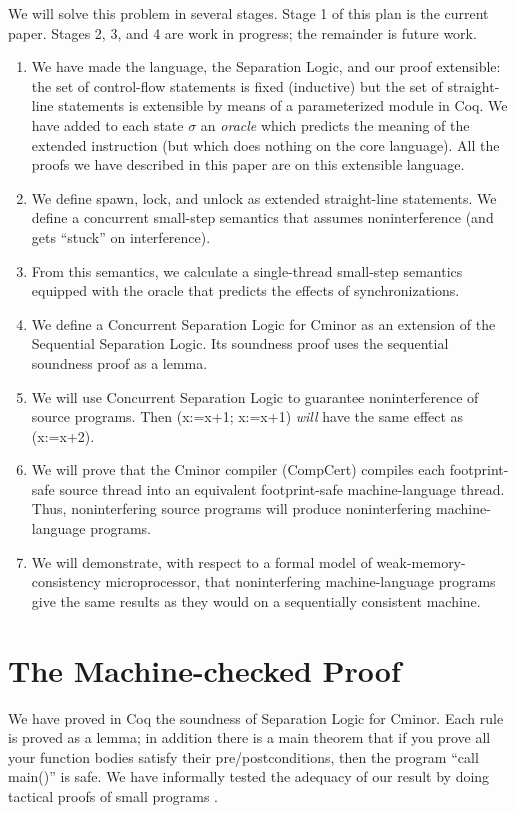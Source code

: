 \documentclass{llncs}
\newcommand{\cminor}{Cminor}
\newcommand{\compcert}{CompCert}
\begin{document}
We will solve this problem in several stages.
Stage 1 of this plan is the current paper.
Stages 2, 3, and 4 are work in progress; 
the remainder is future work.
\begin{enumerate}
\item We have made the language, the Separation Logic, and our proof
extensible: the set of control-flow statements is fixed (inductive) but
the set of straight-line statements is extensible
by means of a parameterized module in Coq.  We have added to each state
$\sigma$ an \emph{oracle} which predicts the meaning of the extended
instruction (but which does nothing on the core language).  All the proofs we
have described in this paper are on this extensible language.
\item 
\label{contrib1}
We define spawn, lock, and unlock as extended straight-line statements.  We define a 
concurrent small-step semantics that 
assumes noninterference 
(and gets ``stuck'' on interference).
\item From this semantics, we calculate
a single-thread small-step semantics equip\-ped with
the oracle that predicts the effects of synchronizations.
\item We define a Concurrent Separation Logic for \cminor{}
as an extension of the Sequential Separation Logic.
Its soundness proof uses the sequential soundness proof
as a lemma.
\item We will use 
Concurrent Separation Logic to guarantee noninterference
of source programs.  Then
(x:=x+1; x:=x+1) \emph{will} have the same effect as
(x:=x+2).
\item We will prove that the \cminor{} compiler (\compcert{})
compiles each
footprint-safe source thread into an equivalent 
footprint-safe machine-language thread.  Thus, noninterfering source
programs will produce noninterfering machine-language programs.
\item We will demonstrate, with respect to a formal model
of weak-memory-consistency microprocessor, that 
noninterfering machine-language programs give the same results as they
would on a sequentially consistent machine.
\end{enumerate}
\vspace{-13pt}

\section{The Machine-checked Proof}
We have proved in Coq the soundness of Separation Logic for \cminor{}.
Each rule is proved as a lemma; in addition there is a main theorem
that if you prove all your function bodies satisfy their pre/postconditions,
then the program ``call main()'' is safe.
We have informally tested the adequacy of our result by doing tactical proofs
of small programs \cite{appel06:septacs}.  
\end{document}
